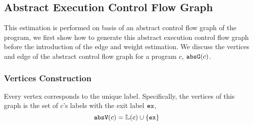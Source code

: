   

\subsection{Abstract Execution Control Flow Graph}
\label{sec:abscfg}

This estimation is performed on basis of an abstract control flow graph of the program, 
we first show how to generate this abstract execution control flow graph before the introduction of  the edge and weight estimation.  
We discuss the vertices and edge of the
abstract control flow graph for a program $c$, $\mathtt{abs}{\mathtt{G}}(c)$.

\subsubsection{Vertices Construction}
\label{sec:abscfg-vertex}
Every 
vertex corresponds to the unique
label.
Specifically,
the vertices of this graph is the set of $c$'s labels with the exit label ${\mathtt{ex}}$, 
\[ 
  \mathtt{abs}{\mathtt{V}}(c) = \mathbb{L}(c)\cup\{{\mathtt{ex}}\}
  \]

